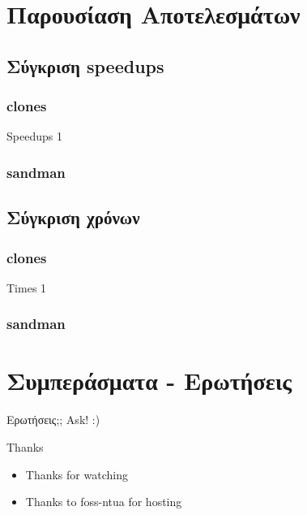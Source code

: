 \documentclass{beamer}
\begin{document}
\section{Παρουσίαση Αποτελεσμάτων}

\subsection{Σύγκριση speedups}
\subsubsection{clones}
\begin{frame}
    Speedups 1
\end{frame}
\subsubsection{sandman}

\subsection{Σύγκριση χρόνων}
\subsubsection{clones}
\begin{frame}
    Times 1
\end{frame}
\subsubsection{sandman}


\section{Συμπεράσματα - Ερωτήσεις}

\begin{frame}{Ερωτήσεις;;}
    Ask! :)
\end{frame}

\begin{frame}[fragile]{Thanks}
    \begin{itemize}
        \item Thanks for watching
        \item Thanks to foss-ntua for hosting
    \end{itemize}
\end{frame}
\end{document}
